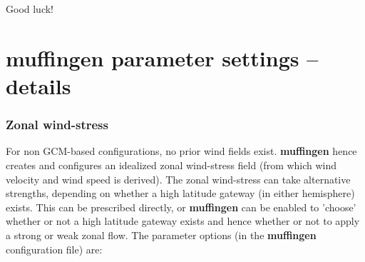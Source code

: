 \documentclass[11pt,fleqn]{book} %
\begin{document}
\vspace{2mm}
Good luck!


\newpage

\section{muffingen parameter settings -- details}


\subsubsection{Zonal wind-stress}

For non GCM-based configurations, no prior wind fields exist. \textbf{muffingen} hence creates and configures an idealized zonal wind-stress field (from which wind velocity and wind speed is derived). The zonal wind-stress can take alternative strengths, depending on whether a high latitude gateway (in either hemisphere) exists. This can be prescribed directly, or \textbf{muffingen} can be enabled to 'choose' whether or not a high latitude gateway exists and hence whether or not to apply a strong or weak zonal flow. The parameter options (in the \textbf{muffingen} configuration file) are:
\end{document}
